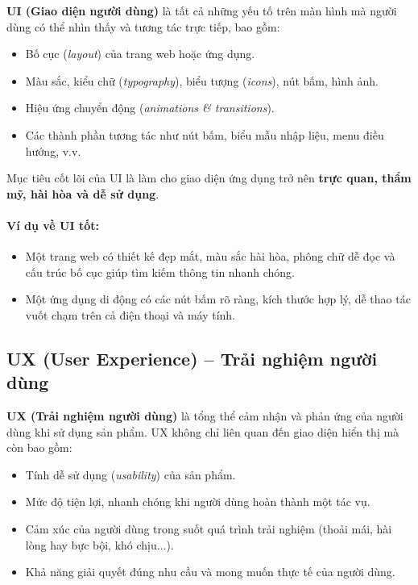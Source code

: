 \documentclass[11pt,oneside]{book}
\newcommand{\term}[1]{\textbf{\textcolor{primaryBlue}{#1}}}
\begin{document}
\term{UI (Giao diện người dùng)} là tất cả những yếu tố trên màn hình mà người dùng có thể nhìn thấy và tương tác trực tiếp, bao gồm:
\begin{itemize}[leftmargin=1.8em, itemsep=2pt, parsep=0pt]
    \item Bố cục (\textit{layout}) của trang web hoặc ứng dụng.
    \item Màu sắc, kiểu chữ (\textit{typography}), biểu tượng (\textit{icons}), nút bấm, hình ảnh.
    \item Hiệu ứng chuyển động (\textit{animations \& transitions}).
    \item Các thành phần tương tác như nút bấm, biểu mẫu nhập liệu, menu điều hướng, v.v.
\end{itemize}

\begin{tipBox}
Mục tiêu cốt lõi của UI là làm cho giao diện ứng dụng trở nên \textbf{trực quan, thẩm mỹ, hài hòa và dễ sử dụng}.
\end{tipBox}

\paragraph{Ví dụ về UI tốt:}
\begin{itemize}[leftmargin=1.8em, itemsep=2pt, parsep=0pt]
    \item Một trang web có thiết kế đẹp mắt, màu sắc hài hòa, phông chữ dễ đọc và cấu trúc bố cục giúp tìm kiếm thông tin nhanh chóng.
    \item Một ứng dụng di động có các nút bấm rõ ràng, kích thước hợp lý, dễ thao tác vuốt chạm trên cả điện thoại và máy tính.
\end{itemize}

\subsection{UX (User Experience) -- Trải nghiệm người dùng}

\term{UX (Trải nghiệm người dùng)} là tổng thể cảm nhận và phản ứng của người dùng khi sử dụng sản phẩm. UX không chỉ liên quan đến giao diện hiển thị mà còn bao gồm:
\begin{itemize}[leftmargin=1.8em, itemsep=2pt, parsep=0pt]
    \item Tính dễ sử dụng (\textit{usability}) của sản phẩm.
    \item Mức độ tiện lợi, nhanh chóng khi người dùng hoàn thành một tác vụ.
    \item Cảm xúc của người dùng trong suốt quá trình trải nghiệm (thoải mái, hài lòng hay bực bội, khó chịu...).
    \item Khả năng giải quyết đúng nhu cầu và mong muốn thực tế của người dùng.
\end{itemize}
\end{document}
